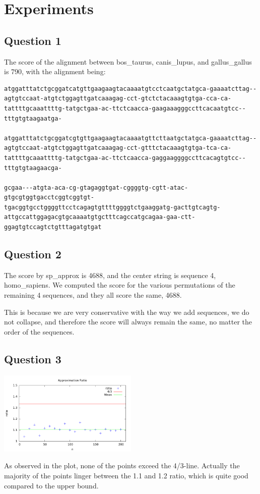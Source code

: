 \section{Experiments}

\subsection{Question 1}
The score of the alignment between bos\_taurus, canis\_lupus, and gallus\_gallus is 790, with the alignment being: 

\begin{verbatim}
atggatttatctgcggatcatgttgaagaagtacaaaatgtcctcaatgctatgca-gaaaatcttag--agtgtccaat-atgtctggagttgatcaaagag-cct-gtctctacaaagtgtga-cca-ca-tattttgcaaattttg-tatgctgaa-ac-ttctcaacca-gaagaaagggccttcacaatgtcc--tttgtgtaagaatga-

atggatttatctgcggatcgtgttgaagaagtacaaaatgttcttaatgctatgca-gaaaatcttag--agtgtccaat-atgtctggagttgatcaaagag-cct-gtttctacaaagtgtga-tca-ca-tattttgcaaattttg-tatgctgaa-ac-ttctcaacca-gaggaaggggccttcacagtgtcc--tttgtgtaagaacga-

gcgaa---atgta-aca-cg-gtagaggtgat-cggggtg-cgtt-atac-gtgcgtggtgacctcggtcggtgt-tgacggtgcctggggttcctcagagtgttttggggtctgaaggatg-gacttgtcagtg-attgccattggagacgtgcaaaatgtgctttcagccatgcagaa-gaa-ctt-ggagtgtccagtctgtttagatgtgat
\end{verbatim}

\subsection{Question 2}
The score by sp\_approx is 4688, and the center string is sequence 4, homo\_sapiens.
We computed the score for the various permutations of the remaining 4 sequences, and they all score the same, 4688. 

This is because we are very conservative with the way we add sequences, we do not collapse, and therefore the score will always remain the same, no matter the order of the sequences. 

\subsection{Question 3}
\begin{center}
    \includegraphics[width=0.5\textwidth]{plot1.pdf}
\end{center}
As observed in the plot, none of the points exceed the 4/3-line. Actually the majority of the points linger between the 1.1 and 1.2 ratio, which is quite good compared to the upper bound. 